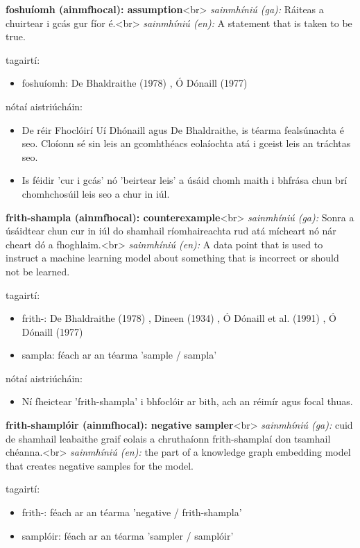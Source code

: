 \documentclass{article}
\begin{document}
\textbf{foshuíomh (ainmfhocal): assumption}<br>
\textit{sainmhíniú (ga):} Ráiteas a chuirtear i gcás gur fíor é.<br>
\textit{sainmhíniú (en):} A statement that is taken to be true.

tagairtí:
\begin{itemize}
	\item foshuíomh: De Bhaldraithe (1978) \cite{de-bhaldraithe}, Ó Dónaill (1977) \cite{odonaill}
\end{itemize}

nótaí aistriúcháin:
\begin{itemize}
	\item De réir Fhoclóirí Uí Dhónaill agus De Bhaldraithe, is téarma fealsúnachta é seo. Cloíonn sé sin leis an gcomhthéacs eolaíochta atá i gceist leis an tráchtas seo.
	\item Is féidir 'cur i gcás' nó 'beirtear leis' a úsáid chomh maith i bhfrása chun brí chomhchosúil leis seo a chur in iúl.
\end{itemize}


\textbf{frith-shampla (ainmfhocal): counterexample}<br>
\textit{sainmhíniú (ga):} Sonra a úsáidtear chun cur in iúl do shamhail ríomhaireachta rud atá mícheart nó nár cheart dó a fhoghlaim.<br>
\textit{sainmhíniú (en):} A data point that is used to instruct a machine learning model about something that is incorrect or should not be learned.

tagairtí:
\begin{itemize}
	\item frith-: De Bhaldraithe (1978) \cite{de-bhaldraithe}, Dineen (1934) \cite{dineen}, Ó Dónaill et al. (1991) \cite{focloir-beag}, Ó Dónaill (1977) \cite{odonaill}
	\item sampla: féach ar an téarma 'sample / sampla'
\end{itemize}

nótaí aistriúcháin:
\begin{itemize}
	\item Ní fheictear 'frith-shampla' i bhfoclóir ar bith, ach an réimír agus focal thuas.
\end{itemize}


\textbf{frith-shamplóir (ainmfhocal): negative sampler}<br>
\textit{sainmhíniú (ga):} cuid de shamhail leabaithe graif eolais a chruthaíonn frith-shamplaí don tsamhail chéanna.<br>
\textit{sainmhíniú (en):} the part of a knowledge graph embedding model that creates negative samples for the model.

tagairtí:
\begin{itemize}
	\item frith-: féach ar an téarma 'negative / frith-shampla'
	\item samplóir: féach ar an téarma 'sampler / samplóir'
\end{itemize}
\end{document}
